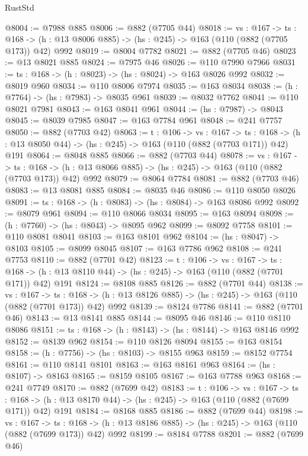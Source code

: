 \begin{lexlean}{RustStd}
\begin{coremodule}
@8004 := @7988 @885
@8006 := @882 (@7705 @44)
@8018 := {vs : @167} ->
  {ts : @168} -> (h : @13 @8006 @885) -> (hs : @245) -> @163 (@110 (@882 (@7705 @173)) @42) @992
@8019 := @8004 @7782
@8021 := @882 (@7705 @46)
@8023 := @13 @8021 @885
@8024 := @7975 @46
@8026 := @110 @7990 @7966
@8031 := {ts : @168} -> (h : @8023) -> (hs : @8024) -> @163 @8026 @992
@8032 := @8019 @960
@8034 := @110 @8006 @7974
@8035 := @163 @8034
@8038 := (h : @7764) -> (hs : @7983) -> @8035 @961
@8039 := @8032 @7762
@8041 := @110 @8021 @7981
@8043 := @163 @8041 @961
@8044 := (hs : @7987) -> @8043
@8045 := @8039 @7985
@8047 := @163 @7784 @961
@8048 := @241 @7757
@8050 := @882 (@7703 @42)
@8063 := {t : @106} ->
  {vs : @167} ->
  {ts : @168} -> (h : @13 @8050 @44) -> (hs : @245) -> @163 (@110 (@882 (@7703 @171)) @42) @191
@8064 := @8048 @885
@8066 := @882 (@7703 @44)
@8078 := {vs : @167} ->
  {ts : @168} -> (h : @13 @8066 @885) -> (hs : @245) -> @163 (@110 (@882 (@7703 @173)) @42) @992
@8079 := @8064 @7784
@8081 := @882 (@7703 @46)
@8083 := @13 @8081 @885
@8084 := @8035 @46
@8086 := @110 @8050 @8026
@8091 := {ts : @168} -> (h : @8083) -> (hs : @8084) -> @163 @8086 @992
@8092 := @8079 @961
@8094 := @110 @8066 @8034
@8095 := @163 @8094
@8098 := (h : @7760) -> (hs : @8043) -> @8095 @962
@8099 := @8092 @7758
@8101 := @110 @8081 @8041
@8103 := @163 @8101 @962
@8104 := (hs : @8047) -> @8103
@8105 := @8099 @8045
@8107 := @163 @7786 @962
@8108 := @241 @7753
@8110 := @882 (@7701 @42)
@8123 := {t : @106} ->
  {vs : @167} ->
  {ts : @168} -> (h : @13 @8110 @44) -> (hs : @245) -> @163 (@110 (@882 (@7701 @171)) @42) @191
@8124 := @8108 @885
@8126 := @882 (@7701 @44)
@8138 := {vs : @167} ->
  {ts : @168} -> (h : @13 @8126 @885) -> (hs : @245) -> @163 (@110 (@882 (@7701 @173)) @42) @992
@8139 := @8124 @7786
@8141 := @882 (@7701 @46)
@8143 := @13 @8141 @885
@8144 := @8095 @46
@8146 := @110 @8110 @8086
@8151 := {ts : @168} -> (h : @8143) -> (hs : @8144) -> @163 @8146 @992
@8152 := @8139 @962
@8154 := @110 @8126 @8094
@8155 := @163 @8154
@8158 := (h : @7756) -> (hs : @8103) -> @8155 @963
@8159 := @8152 @7754
@8161 := @110 @8141 @8101
@8163 := @163 @8161 @963
@8164 := (hs : @8107) -> @8163
@8165 := @8159 @8105
@8167 := @163 @7788 @963
@8168 := @241 @7749
@8170 := @882 (@7699 @42)
@8183 := {t : @106} ->
  {vs : @167} ->
  {ts : @168} -> (h : @13 @8170 @44) -> (hs : @245) -> @163 (@110 (@882 (@7699 @171)) @42) @191
@8184 := @8168 @885
@8186 := @882 (@7699 @44)
@8198 := {vs : @167} ->
  {ts : @168} -> (h : @13 @8186 @885) -> (hs : @245) -> @163 (@110 (@882 (@7699 @173)) @42) @992
@8199 := @8184 @7788
@8201 := @882 (@7699 @46)

\end{coremodule}
\end{lexlean}
